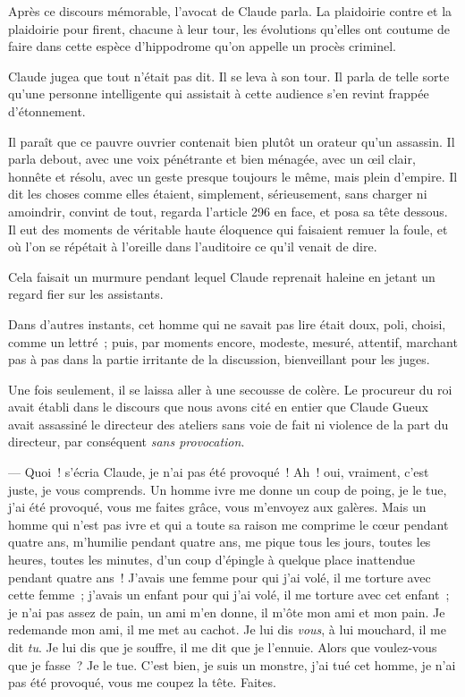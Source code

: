 \documentclass[french,twoside]{book} %
\begin{document}
Après ce discours mémorable, l’avocat de Claude parla. La plaidoirie contre et la plaidoirie pour firent, chacune à leur tour, les évolutions qu’elles ont coutume de faire dans cette espèce d’hippodrome qu’on appelle un procès criminel.\par
Claude jugea que tout n’était pas dit. Il se leva à son tour. Il parla de telle sorte qu’une personne intelligente qui assistait à cette audience s’en revint frappée d’étonnement.\par
Il paraît que ce pauvre ouvrier contenait bien plutôt un orateur qu’un assassin. Il parla debout, avec une voix pénétrante et bien ménagée, avec un œil clair, honnête et résolu, avec un geste presque toujours le même, mais plein d’empire. Il dit les choses comme elles étaient, simplement, sérieusement, sans charger ni amoindrir, convint de tout, regarda l’article 296 en face, et posa sa tête dessous. Il eut des moments de véritable haute éloquence qui faisaient remuer la foule, et où l’on se répétait à l’oreille dans l’auditoire ce qu’il venait de dire.\par
Cela faisait un murmure pendant lequel Claude reprenait haleine en jetant un regard fier sur les assistants.\par
 Dans d’autres instants, cet homme qui ne savait pas lire était doux, poli, choisi, comme un lettré ; puis, par moments encore, modeste, mesuré, attentif, marchant pas à pas dans la partie irritante de la discussion, bienveillant pour les juges.\par
Une fois seulement, il se laissa aller à une secousse de colère. Le procureur du roi avait établi dans le discours que nous avons cité en entier que Claude Gueux avait assassiné le directeur des ateliers sans voie de fait ni violence de la part du directeur, par conséquent \emph{sans provocation}.\par
— Quoi ! s’écria Claude, je n’ai pas été provoqué ! Ah ! oui, vraiment, c’est juste, je vous comprends. Un homme ivre me donne un coup de poing, je le tue, j’ai été provoqué, vous me faites grâce, vous m’envoyez aux galères. Mais un homme qui n’est pas ivre et qui a toute sa raison me comprime le cœur pendant quatre ans, m’humilie pendant quatre ans, me pique tous les jours, toutes les heures, toutes les minutes, d’un coup d’épingle à quelque place inattendue pendant quatre ans ! J’avais une femme pour qui j’ai volé, il me torture avec cette femme ; j’avais un enfant pour qui j’ai volé, il me torture avec cet enfant ; je n’ai pas assez de pain, un ami m’en donne, il m’ôte mon ami et mon pain. Je redemande mon ami, il me met au cachot. Je lui dis \emph{vous}, à lui mouchard, il me dit \emph{tu}. Je lui dis que je souffre, il me dit que je l’ennuie. Alors que voulez-vous que je fasse ? Je le tue. C’est bien, je suis un monstre, j’ai tué cet homme, je n’ai pas été provoqué, vous me coupez la tête. Faites.\par
\end{document}
